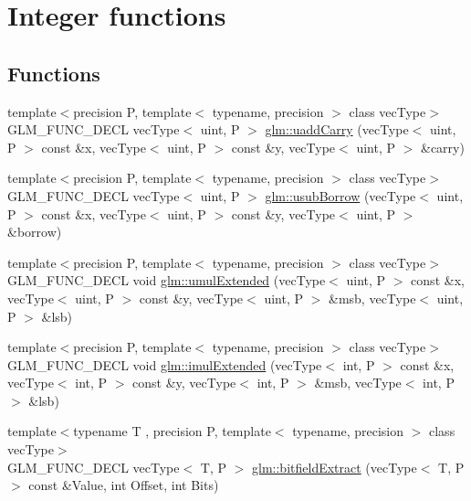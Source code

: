 \hypertarget{group__core__func__integer}{\section{Integer functions}
\label{group__core__func__integer}
}
\subsection*{Functions}
\begin{DoxyCompactItemize}
\item 
{\footnotesize template$<$precision P, template$<$ typename, precision $>$ class vec\-Type$>$ }\\G\-L\-M\-\_\-\-F\-U\-N\-C\-\_\-\-D\-E\-C\-L vec\-Type$<$ uint, P $>$ \hyperlink{group__core__func__integer_ga2fc1a46e7b7e9fbbd8fa444fbacaa2aa}{glm\-::uadd\-Carry} (vec\-Type$<$ uint, P $>$ const \&x, vec\-Type$<$ uint, P $>$ const \&y, vec\-Type$<$ uint, P $>$ \&carry)
\item 
{\footnotesize template$<$precision P, template$<$ typename, precision $>$ class vec\-Type$>$ }\\G\-L\-M\-\_\-\-F\-U\-N\-C\-\_\-\-D\-E\-C\-L vec\-Type$<$ uint, P $>$ \hyperlink{group__core__func__integer_ga22a889bf08313b7e547e2cdb8bb15ee4}{glm\-::usub\-Borrow} (vec\-Type$<$ uint, P $>$ const \&x, vec\-Type$<$ uint, P $>$ const \&y, vec\-Type$<$ uint, P $>$ \&borrow)
\item 
{\footnotesize template$<$precision P, template$<$ typename, precision $>$ class vec\-Type$>$ }\\G\-L\-M\-\_\-\-F\-U\-N\-C\-\_\-\-D\-E\-C\-L void \hyperlink{group__core__func__integer_ga456ff9dcec42f6769a9ae2a2af7f1ce1}{glm\-::umul\-Extended} (vec\-Type$<$ uint, P $>$ const \&x, vec\-Type$<$ uint, P $>$ const \&y, vec\-Type$<$ uint, P $>$ \&msb, vec\-Type$<$ uint, P $>$ \&lsb)
\item 
{\footnotesize template$<$precision P, template$<$ typename, precision $>$ class vec\-Type$>$ }\\G\-L\-M\-\_\-\-F\-U\-N\-C\-\_\-\-D\-E\-C\-L void \hyperlink{group__core__func__integer_ga6e6e8b29ca40d8ca2df10b58ed17d426}{glm\-::imul\-Extended} (vec\-Type$<$ int, P $>$ const \&x, vec\-Type$<$ int, P $>$ const \&y, vec\-Type$<$ int, P $>$ \&msb, vec\-Type$<$ int, P $>$ \&lsb)
\item 
{\footnotesize template$<$typename T , precision P, template$<$ typename, precision $>$ class vec\-Type$>$ }\\G\-L\-M\-\_\-\-F\-U\-N\-C\-\_\-\-D\-E\-C\-L vec\-Type$<$ T, P $>$ \hyperlink{group__core__func__integer_gab84b88f3a8e367774e5dd1c618c353cf}{glm\-::bitfield\-Extract} (vec\-Type$<$ T, P $>$ const \&Value, int Offset, int Bits)

\end{DoxyCompactItemize}
